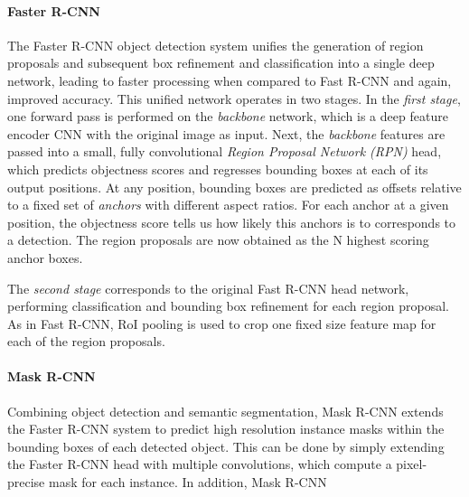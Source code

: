 \paragraph{Faster R-CNN}
The Faster R-CNN object detection system unifies the generation of region proposals and subsequent box refinement and
classification into a single deep network, leading to faster processing when compared to Fast R-CNN
and again, improved accuracy.
This unified network operates in two stages.
In the \emph{first stage}, one forward pass is performed on the \emph{backbone} network,
which is a deep feature encoder CNN with the original image as input.
Next, the \emph{backbone} features are passed into a small, fully convolutional \emph{Region Proposal Network (RPN)} head, which
predicts objectness scores and regresses bounding boxes at each of its output positions.
At any position, bounding boxes are predicted as offsets relative to a fixed set of \emph{anchors} with different
aspect ratios.
For each anchor at a given position, the objectness score tells us how likely this anchors is to corresponds to a detection.
The region proposals are now obtained as the N highest scoring anchor boxes.

The \emph{second stage} corresponds to the original Fast R-CNN head network, performing classification
and bounding box refinement for each region proposal.
As in Fast R-CNN, RoI pooling is used to crop one fixed size feature map for each of the region proposals.


\paragraph{Mask R-CNN}

Combining object detection and semantic segmentation, Mask R-CNN extends the Faster R-CNN system to predict
high resolution instance masks within the bounding boxes of each detected object.
This can be done by simply extending the Faster R-CNN head with multiple convolutions, which
compute a pixel-precise mask for each instance.
In addition, Mask R-CNN
